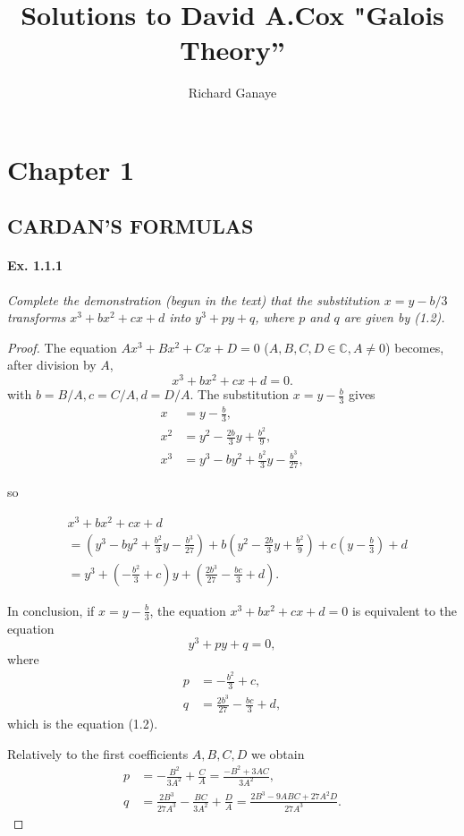 \documentclass[11pt,a4paper]{article}
\title{Solutions to David A.Cox  "Galois Theory''}
\author{Richard Ganaye}
\begin{document}
\maketitle

\section{Chapter 1}

\subsection{CARDAN'S FORMULAS}

\paragraph{Ex. 1.1.1}

{\it Complete the demonstration (begun in the text) that the substitution $x = y-b/3$ transforms $x^3+bx^2+cx+d$ into $y^3+py+q$, where $p$ and $q$ are given by (1.2).
}

\begin{proof}
The equation $Ax^3+Bx^2+Cx+D=0$ ($A,B,C,D \in \mathbb{C},A\neq 0$) becomes,  after division by $A$,
$$x^3+bx^2+cx+d = 0.$$
with $b=B/A,c=C/A,d=D/A.$
The substitution $x = y-\frac{b}{3}$ gives
 \begin{align*}
 x\ & = y-\frac{b}{3},\\
 x^2 &= y^2 -\frac{2b}{3} y +\frac{b^2}{9},\\
 x^3 &= y^3 -by^2+\frac{b^2}{3} y - \frac{b^3}{27},
 \end{align*}
 
so
 
 \begin{align*}
 &x^3+bx^2+cx+d\\
 &=\left(y^3 -by^2+\frac{b^2}{3} y - \frac{b^3}{27}\right) +b\left(y^2 -\frac{2b}{3} y +\frac{b^2}{9}\right)+c\left(y-\frac{b}{3}\right) +d\\
 &=y^3 +\left(-\frac{b^2}{3}+c \right) y + \left(\frac{2b^3}{27}-\frac{bc}{3}+d\right).
 \end{align*}

In conclusion, if $x = y-\frac{b}{3}$, the equation $x^3+bx^2+cx+d = 0$ is equivalent to the equation
$$y^3+py+q=0,$$
where
\begin{align*}
p &= -\frac{b^2}{3}+c, \\
 q &= \frac{2b^3}{27}-\frac{bc}{3}+d, 
 \end{align*}
which is the equation (1.2).

Relatively to the first coefficients $A,B,C,D$ we obtain
\begin{align*}
p &= -\frac{B^2}{3A^2} + \frac{C}{A} = \frac{-B^2+3AC}{3A^2},\\  
q &= \frac{2B^3}{27A^3} - \frac{BC}{3A^2} + \frac{D}{A} = \frac{2B^3-9ABC+27 A^2D}{27A^3}.
 \end{align*}
\end{proof}
\end{document}
